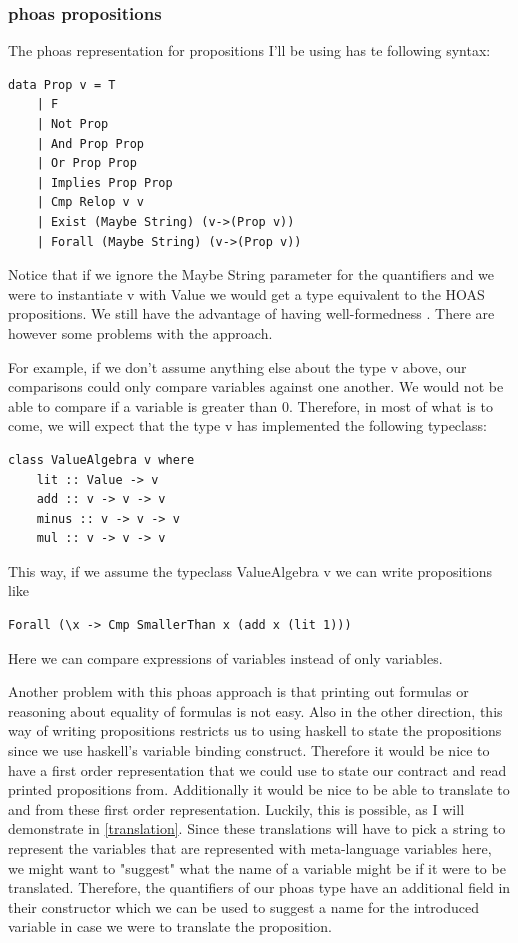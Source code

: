 \subsubsection{phoas propositions}
The phoas representation for propositions I'll be using has te following syntax:
\begin{verbatim}
data Prop v = T 
    | F 
    | Not Prop
    | And Prop Prop 
    | Or Prop Prop 
    | Implies Prop Prop
    | Cmp Relop v v 
    | Exist (Maybe String) (v->(Prop v))
    | Forall (Maybe String) (v->(Prop v))
\end{verbatim}

Notice that if we ignore the Maybe String parameter for the quantifiers and we were to instantiate v with Value we would get a type equivalent to the HOAS propositions. We still have the advantage of having well-formedness . There are however some problems with the approach. 


For example, if we don't assume anything else about the type v above, our comparisons could only compare variables against one another. We would not be able to compare if a variable is greater than 0. Therefore, in most of what is to come, we will expect that the type v has implemented the following typeclass:

\begin{verbatim}
class ValueAlgebra v where
    lit :: Value -> v
    add :: v -> v -> v
    minus :: v -> v -> v
    mul :: v -> v -> v
\end{verbatim}

This way, if we assume the typeclass ValueAlgebra v we can write propositions like 
\begin{verbatim}
Forall (\x -> Cmp SmallerThan x (add x (lit 1)))  
\end{verbatim}

Here we can compare expressions of variables instead of only variables.


Another problem with this phoas approach is that printing out formulas or reasoning about equality of formulas is not easy. Also in the other direction, this way of writing propositions restricts us to using haskell to state the propositions since we use haskell's variable binding construct. Therefore it would be nice to have a first order representation that we could use to state our contract and read printed propositions from. Additionally it would be nice to be able to translate to and from these first order representation. Luckily, this is possible, as I will demonstrate in \ref{translation}. Since these translations will have to pick a string to represent the variables that are represented with meta-language variables here, we might want to "suggest" what the name of a variable might be if it were to be translated. Therefore, the quantifiers of our phoas type have an additional field in their constructor which we can be used to suggest a name for the introduced variable in case we were to translate the proposition. 


